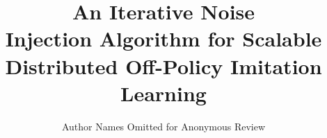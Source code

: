 \documentclass[conference]{article}
\begin{document}
\title{An Iterative Noise\\ Injection Algorithm  for Scalable\\ Distributed Off-Policy Imitation Learning}

\author{Author Names Omitted for Anonymous Review}





% 


\maketitle
\end{document}

